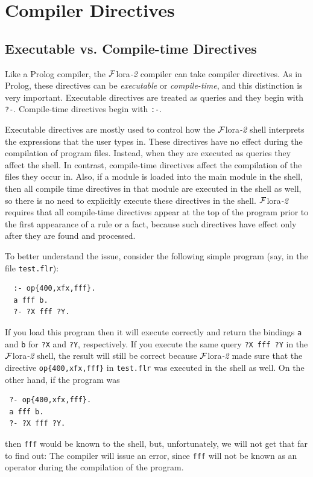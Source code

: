 \documentclass[11pt]{article}
\newcommand{\FLSYSTEM}{{\mbox{\sc ${\cal F}${lora}\rm\emph{-2}}}\xspace}
\newcommand{\flrext}{flr}
\begin{document}
\section{Compiler Directives}
\label{sec-comp-directives}

%
\subsection{Executable vs. Compile-time Directives}

Like a Prolog compiler, the \FLSYSTEM compiler can take compiler directives.
As in Prolog, these directives can be \emph{executable} or
\emph{compile-time}, and this distinction is very important.
Executable directives are treated as queries and they begin with {\tt ?-}.
Compile-time directives begin with {\tt :-}.

Executable directives are mostly used to control how the \FLSYSTEM shell
interprets the expressions that the user types in. These directives have no
effect during the compilation of program files. Instead, when they are
executed as queries they affect the shell. In contrast, compile-time
directives affect the compilation of the files they occur in. Also, if a
module is loaded into the main module in the shell, then all compile time
directives in that module are executed in the shell as well, so there is no
need to explicitly execute these directives in the shell.
\FLSYSTEM requires
that all compile-time directives appear at the top of the program prior to
the first appearance of a rule or a fact, because such directives have
effect only after they are found and processed.

To better understand the issue, consider the following simple program
(say, in the file {\tt test.\flrext}):
\begin{verbatim}
  :- op{400,xfx,fff}.
  a fff b.
  ?- ?X fff ?Y.
\end{verbatim}
If you load this program then it will execute correctly and return the
bindings {\tt a} and {\tt b} for {\tt ?X} and {\tt ?Y}, respectively.
If you execute the same query {\tt ?X fff ?Y} in the \FLSYSTEM shell,
the result will still be correct because \FLSYSTEM made sure that the
directive {\tt op\{400,xfx,fff\}} in
{\tt test.\flrext} was executed in the shell as well.
On the other hand, if the program was
\begin{verbatim}
 ?- op{400,xfx,fff}.
 a fff b.
 ?- ?X fff ?Y.
\end{verbatim}
then {\tt fff} would be known to the shell, but, unfortunately, we
will not get that far to find out: The compiler will issue an error, since
{\tt fff} will not be known as an operator during the compilation of the
program.
\end{document}
